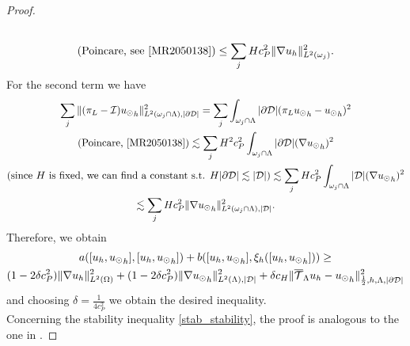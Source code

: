 \begin{proof}
\begin{multline*}
\\ 
(\text{Poincare, see \cite[Corollary B.65]{MR2050138}})\leq \sum _j  H c_P ^2 \|\nabla u_h\|^2_{L^2(\omega _j)}.
\end{multline*}
For the second term we have
\begin{multline*}
\sum _j \|(\pi_L - \mathcal{I}){\ud}_h\|^2_{L^2(\patch\cap \Lambda),|\DD|} = \sum _j \int_{\patch\cap \Lambda} |\DD| (\pi_L {\ud}_h -{\ud}_h)^2
\\
(\text{Poincare, \cite[Corollary B.65]{MR2050138}})\lesssim \sum _j  H^2 c_P^2 \int_{\patch\cap \Lambda} |\DD|(\nabla {\ud}_h)^2
\\
(\text{since $H$ is fixed, we can find a constant s.t. } H|\DD| \lesssim |\D|) \lesssim \sum _j H c_P^2  \int_{\patch\cap \Lambda} |\D|(\nabla {\ud}_h)^2 
\\
\lesssim \sum _j H c_P^2  \|\nabla {\ud}_h\|^2_{L^2(\patch\cap \Lambda),|\D|}.
\end{multline*}
Therefore, we obtain
\begin{multline*}
a([u_h, {u_{\odot}}_h],[u_h, {u_{\odot}}_h] ) + b([u_h, {u_{\odot}}_h], \xi_h([u_h, {u_{\odot}}_h]))
\geq \\
(1-2\delta c_P^2) \|\nabla u_h\|^2_{L^2(\Omega)} + (1- 2\delta c_P^2) \|\nabla {u_{\odot}}_h\|^2_{L^2(\Lambda), |\mathcal{D}|}
+\delta c_H  \|{\overline{\mathcal{T}}_\Lambda} u_h-{u_{\odot}}_h\|^2_{\frac 12,h,\Lambda, |\partial\mathcal{D}|}
\end{multline*}
and choosing $\delta=\frac{1}{4c_P^2}$ we obtain the desired inequality.\\
Concerning the stability inequality \eqref{stab_stability}, the proof is analogous to the one in \cite{burman2014}.
\end{proof}

